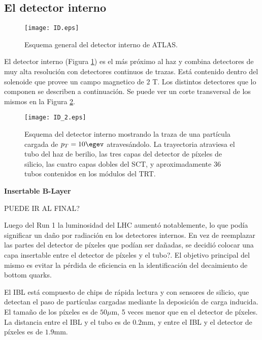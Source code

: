 \subsection{El detector interno}

\begin{figure}
\centering
\texttt{[image: ID.eps]}
\caption{Esquema general del detector interno de ATLAS.}
\label{ID}
\end{figure}

El detector interno (Figura \ref{ID}) es el más próximo al haz y combina detectores de muy alta resolución con detectores continuos de trazas. Está contenido dentro del solenoide que provee un campo magnetico de $2$ T. Los distintos detectores que lo componen se describen a continuación. Se puede ver un corte transversal de los mismos en la Figura \ref{ID_2}.

\begin{figure}
\centering
\texttt{[image: ID\_2.eps]}
\caption{Esquema del detector interno mostrando la traza de una partícula cargada de $p_{T}=10\egev$ atravesándolo. La trayectoria atraviesa el tubo del haz de  berilio, las tres capas del detector de píxeles de silicio, las cuatro capas dobles del SCT, y aproximadamente 36 tubos contenidos en los módulos del TRT.}
\label{ID_2}
\end{figure}
\vspace{0.5cm}

{\bf Insertable B-Layer}

PUEDE IR AL FINAL?

Luego del Run 1 la luminosidad del LHC aumentó notablemente, lo que podía significar un daño por radiación en los detectores internos. En vez de reemplazar las partes del detector de píxeles que podían ser dañadas, se decidió colocar una capa insertable entre el detector de píxeles y el tubo?. El objetivo principal del mismo es evitar la pérdida de eficiencia en la identificación del decaimiento de bottom quarks.

El IBL está compuesto de chips de rápida lectura y con sensores de silicio, que detectan el paso de partículas cargadas mediante la deposición de carga inducida. El tamaño de los píxeles es de $50\mu$m, 5 veces menor que en el detector de píxeles. La distancia entre el IBL y el tubo es de $0.2$mm, y entre el IBL y el detector de píxeles es de $1.9$mm. 

